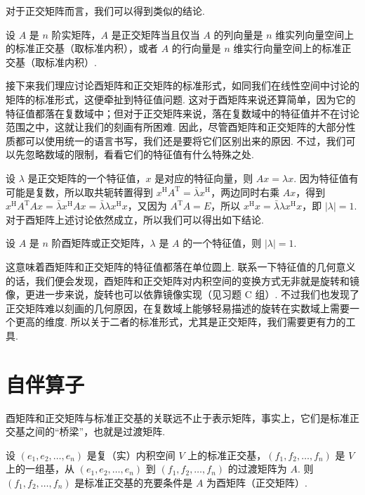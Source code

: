 对于正交矩阵而言，我们可以得到类似的结论.

\begin{theorem}{}{}
    设 $ A $ 是 $ n $ 阶实矩阵，$ A $ 是正交矩阵当且仅当 $ A $ 的列向量是 $ n $ 维实列向量空间上的标准正交基（取标准内积），或者 $ A $ 的行向量是 $ n $ 维实行向量空间上的标准正交基（取标准内积）.
\end{theorem}

接下来我们理应讨论酉矩阵和正交矩阵的标准形式，如同我们在线性空间中讨论的矩阵的标准形式，这便牵扯到特征值问题. 这对于酉矩阵来说还算简单，因为它的特征值都落在复数域中；但对于正交矩阵来说，落在复数域中的特征值并不在讨论范围之中，这就让我们的刻画有所困难. 因此，尽管酉矩阵和正交矩阵的大部分性质都可以使用统一的语言书写，我们还是要将它们区别出来的原因. 不过，我们可以先忽略数域的限制，看看它们的特征值有什么特殊之处.

设 $ \lambda $ 是正交矩阵的一个特征值，$ x $ 是对应的特征向量，则 $ Ax = \lambda x $. 因为特征值有可能是复数，所以取共轭转置得到 $ x^{\mathrm{H}}A^{\mathrm{T}} = \bar{\lambda} x^{\mathrm{H}} $，两边同时右乘 $ Ax $，得到 $ x^{\mathrm{H}}A^{\mathrm{T}}Ax = \bar{\lambda} x^{\mathrm{H}}Ax = \bar{\lambda} \lambda x^{\mathrm{H}}x $，又因为 $ A^{\mathrm{T}}A = E $，所以 $ x^{\mathrm{H}}x = \bar{\lambda} \lambda x^{\mathrm{H}}x $，即 $ \lvert \lambda \rvert = 1 $. 对于酉矩阵上述讨论依然成立，所以我们可以得出如下结论.

\begin{theorem}{}{}
    设 $ A $ 是 $ n $ 阶酉矩阵或正交矩阵，$ \lambda $ 是 $ A $ 的一个特征值，则 $ \lvert \lambda \rvert = 1 $.
\end{theorem}


这意味着酉矩阵和正交矩阵的特征值都落在单位圆上. 联系一下特征值的几何意义的话，我们便会发现，酉矩阵和正交矩阵对内积空间的变换方式无非就是旋转和镜像，更进一步来说，旋转也可以依靠镜像实现（见习题 C 组）. 不过我们也发现了正交矩阵难以刻画的几何原因，在复数域上能够轻易描述的旋转在实数域上需要一个更高的维度. 所以关于二者的标准形式，尤其是正交矩阵，我们需要更有力的工具.

\section{自伴算子}

酉矩阵和正交矩阵与标准正交基的关联远不止于表示矩阵，事实上，它们是标准正交基之间的“桥梁”，也就是过渡矩阵.

\begin{theorem}{}{}
    设 $ (e_1, e_2, \ldots , e_n) $ 是复（实）内积空间 $ V $ 上的标准正交基，$ (f_1, f_2, \ldots , f_n) $ 是 $ V $ 上的一组基，从 $ (e_1, e_2, \ldots , e_n) $ 到 $ (f_1, f_2, \ldots , f_n) $ 的过渡矩阵为 $ A $. 则 $ (f_1, f_2, \ldots , f_n) $ 是标准正交基的充要条件是 $ A $ 为酉矩阵（正交矩阵）.
\end{theorem}

